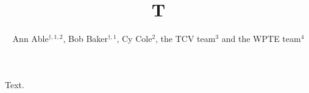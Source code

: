 \documentclass[10pt]{iopart}
\begin{document}
\title{T}
\author{Ann Able$^{\dagger,1,2}$, Bob Baker$^{\dagger,1}$, Cy Cole$^{2}$, the TCV team$^3$ and the WPTE team$^{4}$}
\address{$^1$Univ A}
\address{$^2$Univ B}
\address{$^3$See author list of B. P. Duval \textit{et al.} 2024}
\address{$^4$See author list of E. Joffrin \textit{et al.} 2024}
\maketitle
Text.
\end{document}
